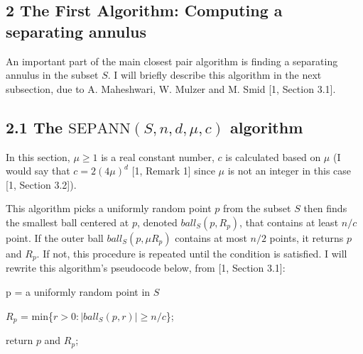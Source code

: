 \documentclass[12pt,english,]{article}
\newcommand{\pnt}[1]{{\scriptstyle#1}}
\let\origfigure\figure
\let\endorigfigure\endfigure
\renewenvironment{figure}[1][2] {
    \expandafter\origfigure\expandafter[H]
} {
    \endorigfigure
}
\begin{document}
\hypertarget{the-first-algorithm-computing-a-separating-annulus}{%
\subsection{\texorpdfstring{2 \enspace The First Algorithm: Computing a
separating
annulus}{2 The First Algorithm: Computing a separating annulus}}\label{the-first-algorithm-computing-a-separating-annulus}}

An important part of the main closest pair algorithm is finding a
separating annulus in the subset \(S\). I will briefly describe this
algorithm in the next subsection, due to A. Maheshwari, W. Mulzer and M.
Smid {[}1, Section 3.1{]}.

\hypertarget{the-mathrmspntepapntnnsndmuc-algorithm}{%
\subsection{\texorpdfstring{2.1 The
\(\mathrm{S\pnt{EP}A\pnt{NN}}(S,n,d,\mu,c)\)
algorithm}{2.1 The \textbackslash{}mathrm\{S\textbackslash{}pnt\{EP\}A\textbackslash{}pnt\{NN\}\}(S,n,d,\textbackslash{}mu,c) algorithm}}\label{the-mathrmspntepapntnnsndmuc-algorithm}}

In this section, \(\mu \ge1\) is a real constant number, \(c\) is
calculated based on \(\mu\) (I would say that \(c = 2(4\mu)^d\) {[}1,
Remark 1{]} since \(\mu\) is not an integer in this case {[}1, Section
3.2{]}).

This algorithm picks a uniformly random point \(p\) from the subset
\(S\) then finds the smallest ball centered at \(p\), denoted
\(ball_S(p, R_p)\), that contains at least \(n/c\) point. If the outer
ball \(ball_S(p,\mu R_p)\) contains at most \(n/2\) points, it returns
\(p\) and \(R_p\). If not, this procedure is repeated until the
condition is satisfied. I will rewrite this algorithm's pseudocode
below, from {[}1, Section 3.1{]}:

\begin{figure}[ht]
  \centering
  \begin{minipage}{.8\linewidth}
    {\LinesNotNumbered
    \begin{algorithm}[H]
    \DontPrintSemicolon
    \SetAlgoLined
    \BlankLine
      {p = a uniformly random point in $S$

      $R_p$ = min\{$r > 0: |ball_S(p, r)| \geq n/c$\};}
      return $p$ and $R_p$;
    \caption{\textsc{SepAnn}$(S,n,d,\mu,c)$}
    \end{algorithm}}
  \end{minipage}
\end{figure}
\end{document}
